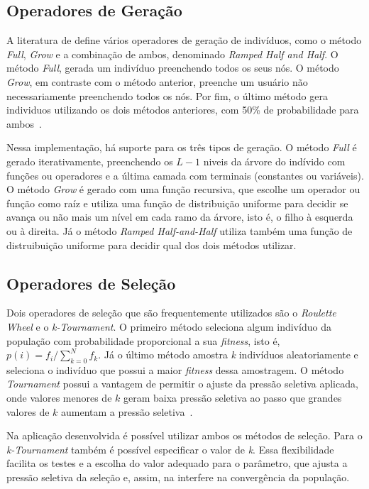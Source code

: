 \documentclass[a4paper]{paper}
\begin{document}
\subsection{Operadores de Geração} \label{subsec:generation}

A literatura de define vários operadores de geração de indivíduos, como o método
\textit{Full}, \textit{Grow} e a combinação de ambos, denominado \textit{Ramped
  Half and Half}. O método \textit{Full}, gerada um indivíduo preenchendo todos os
seus nós. O método \textit{Grow}, em contraste com o método anterior, preenche
um usuário não necessariamente preenchendo todos os nós. Por fim, o último método
gera individuos utilizando os dois métodos anteriores, com 50\% de probabilidade
para ambos~\citep{poli2008}.

Nessa implementação, há suporte para os três tipos de geração. O método
\textit{Full} é gerado iterativamente, preenchendo os $L-1$ niveis da árvore do
indívido com funções ou operadores e a última camada com terminais (constantes
ou variáveis).  O método \textit{Grow} é gerado com uma função recursiva, que
escolhe um operador ou função como raíz e utiliza uma função de distribuição
uniforme para decidir se avança ou não mais um nível em cada ramo da árvore,
isto é, o filho à esquerda ou à direita. Já o método \textit{Ramped
  Half-and-Half} utiliza também uma função de distruibuição uniforme para
decidir qual dos dois métodos utilizar.

\subsection{Operadores de Seleção} \label{subsec:selection}

Dois operadores de seleção que são frequentemente utilizados são o
\textit{Roulette Wheel} e o \textit{k-Tournament}. O primeiro método seleciona
algum indivíduo da população com probabilidade proporcional a sua
\textit{fitness}, isto é, $p(i)=f_i/\sum_{k=0}^{N}f_k$. Já o último método
amostra \textit{k} indivíduos aleatoriamente e seleciona o indivíduo que possui
a maior \textit{fitness} dessa amostragem. O método \textit{Tournament} possui
a vantagem de permitir o ajuste da pressão seletiva aplicada, onde valores
menores de $k$ geram baixa pressão seletiva ao passo que grandes valores de $k$
aumentam a pressão seletiva~\citep{Baeck1994}.

Na aplicação desenvolvida é possível utilizar ambos os métodos de seleção. Para
o \textit{k-Tournament} também é possível especificar o valor de \textit{k}.
Essa flexibilidade facilita os testes e a escolha do valor adequado para o
parâmetro, que ajusta a pressão seletiva da seleção e, assim, na interfere na
convergência da população.
\end{document}
